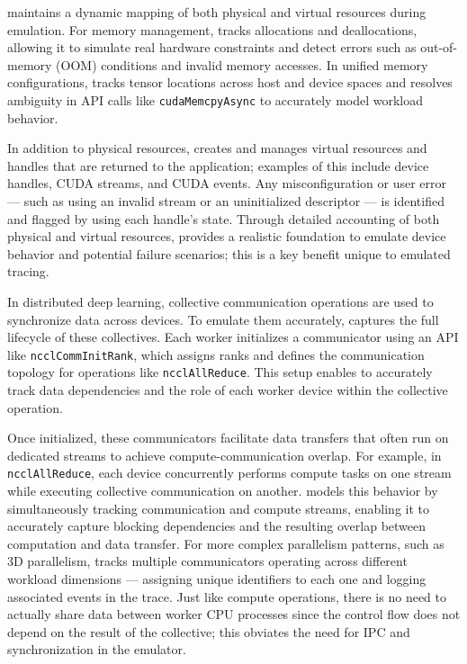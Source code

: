  \sysname maintains a dynamic mapping of both physical and virtual resources during emulation. For memory management, \sysname tracks allocations and deallocations, allowing it to simulate real hardware constraints and detect errors such as out-of-memory (OOM) conditions and invalid memory accesses. In unified memory configurations, \sysname tracks tensor locations across host and device spaces and resolves ambiguity in API calls like \texttt{cudaMemcpyAsync} to accurately model workload behavior. 

In addition to physical resources, \sysname creates and manages virtual resources and handles that are returned to the application; examples of this include device handles, CUDA streams, and CUDA events. Any misconfiguration or user error --- such as using an invalid stream or an uninitialized descriptor --- is identified and flagged by \sysname using each handle's state. Through detailed accounting of both physical and virtual resources, \sysname provides a realistic foundation to emulate device behavior and potential failure scenarios; this is a key benefit unique to emulated tracing.

 In distributed deep learning, collective communication operations are used to synchronize data across devices. To emulate them accurately, \sysname captures the full lifecycle of these collectives. Each worker initializes a communicator using an API like \texttt{ncclCommInitRank}, which assigns ranks and defines the communication topology for operations like \texttt{ncclAllReduce}. This setup enables \sysname to accurately track data dependencies and the role of each worker device within the collective operation.

Once initialized, these communicators facilitate data transfers that often run on dedicated streams to achieve compute-communication overlap. For example, in \texttt{ncclAllReduce}, each device concurrently performs compute tasks on one stream while executing collective communication on another. \sysname models this behavior by simultaneously tracking communication and compute streams, enabling it to accurately capture blocking dependencies and the resulting overlap between computation and data transfer. For more complex parallelism patterns, such as 3D parallelism, \sysname tracks multiple communicators operating across different workload dimensions --- assigning unique identifiers to each one and logging associated events in the trace. Just like compute operations, there is no need to actually share data between worker CPU processes since the control flow does not depend on the result of the collective; this obviates the need for IPC and synchronization in the emulator.

